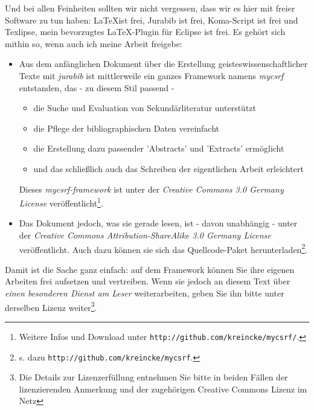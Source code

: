 Und bei allen Feinheiten sollten wir nicht vergessen, dass wir es hier mit
freier Software zu tun haben: \LaTeX ist frei, Jurabib ist frei, Koma-Script ist
frei und Texlipse, mein bevorzugtes \LaTeX-Plugin für Eclipse ist frei. Es gehört
sich mithin so, wenn auch ich meine Arbeit freigebe: 

\begin{itemize}
  \item Aus dem anfänglichen Dokument über die Erstellung
  geisteswissenschaftlicher Texte mit \textit{jurabib} ist mittlerweile ein
  ganzes Framework namens \textit{mycsrf} entstanden, das - zu diesem Stil
  passend -
  \begin{itemize}
    \item die Suche und Evaluation von Sekundärliteratur unterstützt
    \item die Pflege der bibliographischen Daten vereinfacht
    \item die Erstellung dazu passender 'Abstracts' und 'Extracts' ermöglicht
    \item und das schließlich auch das Schreiben der eigentlichen Arbeit
    erleichtert
  \end{itemize}
  Dieses \textit{mycsrf-framework} ist unter der \textit{Creative Commons
  3.0 Germany License} veröffentlicht\footnote{Weitere Infos und Download unter
  \texttt{http://github.com/kreincke/mycsrf/}.}.
  \item Das Dokument jedoch, was sie gerade lesen, ist - davon unabhängig -
  unter der \textit{Creative Commons Attribution-ShareAlike 3.0 Germany License}
  veröffentlicht. Auch dazu können sie sich das Quellcode-Paket
  herunterladen\footnote{s. dazu
  \texttt{http://github.com/kreincke/mycsrf}.}.
\end{itemize}

Damit ist die Sache ganz einfach: auf dem Framework können Sie ihre eigenen
Arbeiten frei aufsetzen und vertreiben. Wenn sie jedoch an diesem Text über
\textit{einen besonderen Dienst am Leser} weiterarbeiten, geben Sie ihn bitte
unter derselben Lizenz weiter\footnote{Die Details zur Lizenzerfüllung entnehmen
Sie bitte in beiden Fällen der lizenzierenden Anmerkung und der zugehörigen
Creative Commons Lizenz im Netz}.

